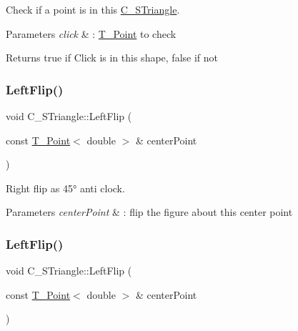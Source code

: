 Check if a point is in this \hyperlink{classC__STriangle}{C\+\_\+\+S\+Triangle}. 


\begin{DoxyParams}{Parameters}
{\em click} & \+: \hyperlink{classT__Point}{T\+\_\+\+Point} to check \\
\hline
\end{DoxyParams}
\begin{DoxyReturn}{Returns}
true if Click is in this shape, false if not 
\end{DoxyReturn}
\mbox{\label{classC__STriangle_aec7540d5750509269894dc4c906fc20f}} 
\subsubsection{\texorpdfstring{Left\+Flip()}{LeftFlip()}\hspace{0.1cm}{\footnotesize\ttfamily [1/2]}}
{\footnotesize\ttfamily void C\+\_\+\+S\+Triangle\+::\+Left\+Flip (\begin{DoxyParamCaption}\item[{const \hyperlink{classT__Point}{T\+\_\+\+Point}$<$ double $>$ \&}]{center\+Point }\end{DoxyParamCaption})}



Right flip as 45° anti clock. 


\begin{DoxyParams}{Parameters}
{\em center\+Point} & \+: flip the figure about this center point \\
\hline
\end{DoxyParams}
\mbox{\label{classC__STriangle_aec7540d5750509269894dc4c906fc20f}} 
\subsubsection{\texorpdfstring{Left\+Flip()}{LeftFlip()}\hspace{0.1cm}{\footnotesize\ttfamily [2/2]}}
{\footnotesize\ttfamily void C\+\_\+\+S\+Triangle\+::\+Left\+Flip (\begin{DoxyParamCaption}\item[{const \hyperlink{classT__Point}{T\+\_\+\+Point}$<$ double $>$ \&}]{center\+Point }\end{DoxyParamCaption})}



